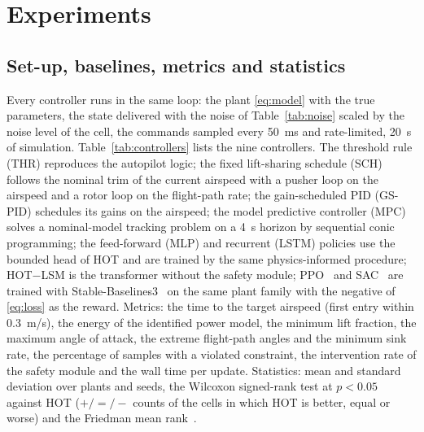 \section{Experiments}\label{sec:experiments}
\subsection{Set-up, baselines, metrics and statistics}
Every controller runs in the same loop: the plant \eqref{eq:model} with the true parameters, the state delivered with the noise of Table~\ref{tab:noise} scaled by the noise level of the cell, the commands sampled every \SI{50}{ms} and rate-limited, \SI{20}{s} of simulation. Table~\ref{tab:controllers} lists the nine controllers. The threshold rule (THR) reproduces the autopilot logic; the fixed lift-sharing schedule (SCH) follows the nominal trim of the current airspeed with a pusher loop on the airspeed and a rotor loop on the flight-path rate; the gain-scheduled PID (GS-PID) schedules its gains on the airspeed; the model predictive controller (MPC) solves a nominal-model tracking problem on a \SI{4}{s} horizon by sequential conic programming; the feed-forward (MLP) and recurrent (LSTM) policies use the bounded head of HOT and are trained by the same physics-informed procedure; HOT$-$LSM is the transformer without the safety module; PPO~\cite{Schulman2017} and SAC~\cite{Haarnoja2018} are trained with Stable-Baselines3~\cite{Raffin2021} on the same plant family with the negative of \eqref{eq:loss} as the reward. Metrics: the time to the target airspeed (first entry within \SI{0.3}{m/s}), the energy of the identified power model, the minimum lift fraction, the maximum angle of attack, the extreme flight-path angles and the minimum sink rate, the percentage of samples with a violated constraint, the intervention rate of the safety module and the wall time per update. Statistics: mean and standard deviation over plants and seeds, the Wilcoxon signed-rank test at $p<0.05$ against HOT ($+/=/-$ counts of the cells in which HOT is better, equal or worse) and the Friedman mean rank~\cite{Demsar2006}.

